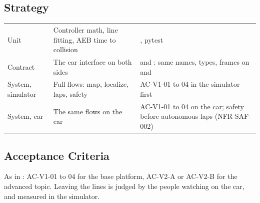 \documentclass[11pt,a4paper]{article}
\begin{document}
\subsection{Strategy}
\begin{tabularx}{\textwidth}{@{}L{3cm} L{4cm} Y@{}}
\toprule
{} &  &  \\
\midrule
Unit & Controller math, line fitting, AEB time to collision & , pytest \\
Contract & The car interface on both sides &  and : same names, types, frames on  and  \\
System, simulator & Full flows: map, localize, laps, safety & AC-V1-01 to 04 in the simulator first \\
System, car & The same flows on the car & AC-V1-01 to 04 on the car; safety before autonomous laps (NFR-SAF-002) \\
\bottomrule
\end{tabularx}

\subsection{Acceptance Criteria}
As in : AC-V1-01 to 04 for the base platform, AC-V2-A or AC-V2-B for the advanced topic. Leaving the lines is judged by the people watching on the car, and measured in the simulator.

\end{document}
